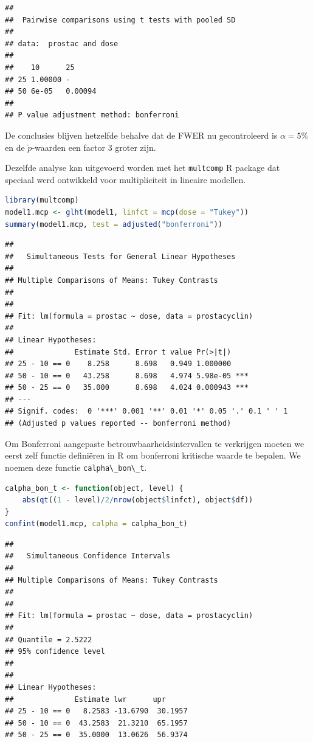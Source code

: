 \documentclass[
  12pt,dutch,coursenotes]{book}
\newcommand{\passthrough}[1]{#1}
\theoremstyle{definition}
\theoremstyle{definition}
\theoremstyle{definition}
\theoremstyle{definition}
\theoremstyle{remark}
\begin{document}
\begin{lstlisting}
## 
##  Pairwise comparisons using t tests with pooled SD 
## 
## data:  prostac and dose 
## 
##    10      25     
## 25 1.00000 -      
## 50 6e-05   0.00094
## 
## P value adjustment method: bonferroni
\end{lstlisting}

De conclusies blijven hetzelfde behalve dat de FWER nu gecontroleerd is \(\alpha=5\%\) en de \(\tilde{p}\)-waarden een factor 3 groter zijn.

Dezelfde analyse kan uitgevoerd worden met het \passthrough{\lstinline!multcomp!} R package dat speciaal werd ontwikkeld voor multipliciteit in lineaire modellen.

\begin{lstlisting}[language=R]
library(multcomp)
model1.mcp <- glht(model1, linfct = mcp(dose = "Tukey"))
summary(model1.mcp, test = adjusted("bonferroni"))
\end{lstlisting}

\begin{lstlisting}
## 
##   Simultaneous Tests for General Linear Hypotheses
## 
## Multiple Comparisons of Means: Tukey Contrasts
## 
## 
## Fit: lm(formula = prostac ~ dose, data = prostacyclin)
## 
## Linear Hypotheses:
##              Estimate Std. Error t value Pr(>|t|)    
## 25 - 10 == 0    8.258      8.698   0.949 1.000000    
## 50 - 10 == 0   43.258      8.698   4.974 5.98e-05 ***
## 50 - 25 == 0   35.000      8.698   4.024 0.000943 ***
## ---
## Signif. codes:  0 '***' 0.001 '**' 0.01 '*' 0.05 '.' 0.1 ' ' 1
## (Adjusted p values reported -- bonferroni method)
\end{lstlisting}

Om Bonferroni aangepaste betrouwbaarheidsintervallen te verkrijgen moeten we eerst zelf functie definiëren in R om bonferroni kritische waarde te bepalen. We noemen deze functie \passthrough{\lstinline!calpha\_bon\_t!}.

\begin{lstlisting}[language=R]
calpha_bon_t <- function(object, level) {
    abs(qt((1 - level)/2/nrow(object$linfct), object$df))
}
confint(model1.mcp, calpha = calpha_bon_t)
\end{lstlisting}

\begin{lstlisting}
## 
##   Simultaneous Confidence Intervals
## 
## Multiple Comparisons of Means: Tukey Contrasts
## 
## 
## Fit: lm(formula = prostac ~ dose, data = prostacyclin)
## 
## Quantile = 2.5222
## 95% confidence level
##  
## 
## Linear Hypotheses:
##              Estimate lwr      upr     
## 25 - 10 == 0   8.2583 -13.6790  30.1957
## 50 - 10 == 0  43.2583  21.3210  65.1957
## 50 - 25 == 0  35.0000  13.0626  56.9374
\end{lstlisting}
\end{document}
